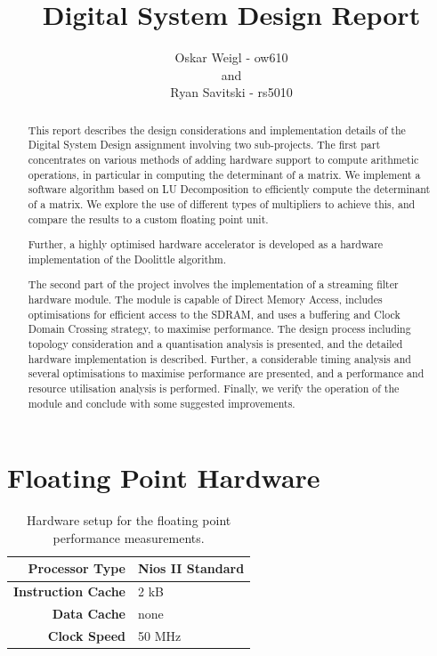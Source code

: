 \documentclass[]{article}
\title{Digital System Design Report}
\author{Oskar Weigl - ow610\\ and \\ Ryan Savitski - rs5010}
\begin{document}
\maketitle

\begin{abstract}

	This report describes the design considerations and implementation details of the Digital System Design assignment involving two sub-projects.
	The first part concentrates on various methods of adding hardware support to compute arithmetic operations, in particular in computing the determinant of a matrix.
	We implement a software algorithm based on LU Decomposition to efficiently compute the determinant of a matrix. We explore the use of different types of multipliers to achieve this, and compare the results to a custom floating point unit.

	Further, a highly optimised hardware accelerator is developed as a hardware implementation of the Doolittle algorithm.

	The second part of the project involves the implementation of a streaming filter hardware module.
	The module is capable of Direct Memory Access, includes optimisations for efficient access to the SDRAM, and uses a buffering and Clock Domain Crossing strategy, to maximise performance.
	The design process including topology consideration and a quantisation analysis is presented, and the detailed hardware implementation is described.
	Further, a considerable timing analysis and several optimisations to maximise performance are presented, and a performance and resource utilisation analysis is performed. 
	Finally, we verify the operation of the module and conclude with some suggested improvements.

\end{abstract}
\clearpage


\tableofcontents
\clearpage


\section{Floating Point Hardware} %
\label{sec:floating_point_hardware}


\begin{table}[bp]
	\caption{Hardware setup for the floating point performance measurements.}
	\label{tab:fp_hw_setup}
	\begin{center}
		\begin{tabular}{r|l}
		\hline

		\hline
			\textbf{Processor Type} 	& Nios II Standard \\
		\hline
			\textbf{Instruction Cache}	& 2 kB \\
		\hline
			\textbf{Data Cache}			& none \\
		\hline
			\textbf{Clock Speed}		& 50 MHz \\
		\hline

		\hline
		\end{tabular}
	\end{center}
\end{table}
\end{document}
